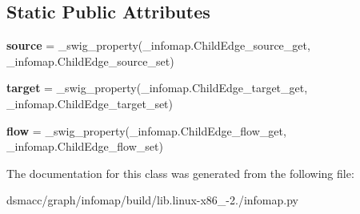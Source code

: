 \subsection*{Static Public Attributes}
\begin{DoxyCompactItemize}
\item 
\mbox{\label{classinfomap_1_1ChildEdge_acae869181b3ff2f642e2d7c5cd6a999a}} 
{\bfseries source} = \+\_\+swig\+\_\+property(\+\_\+infomap.\+Child\+Edge\+\_\+source\+\_\+get, \+\_\+infomap.\+Child\+Edge\+\_\+source\+\_\+set)
\item 
\mbox{\label{classinfomap_1_1ChildEdge_a4333a47eb56d91a50c30a27ad4af1999}} 
{\bfseries target} = \+\_\+swig\+\_\+property(\+\_\+infomap.\+Child\+Edge\+\_\+target\+\_\+get, \+\_\+infomap.\+Child\+Edge\+\_\+target\+\_\+set)
\item 
\mbox{\label{classinfomap_1_1ChildEdge_a7df2a800ca7107691d50564b181814c0}} 
{\bfseries flow} = \+\_\+swig\+\_\+property(\+\_\+infomap.\+Child\+Edge\+\_\+flow\+\_\+get, \+\_\+infomap.\+Child\+Edge\+\_\+flow\+\_\+set)
\end{DoxyCompactItemize}


The documentation for this class was generated from the following file\+:\begin{DoxyCompactItemize}
\item 
dsmacc/graph/infomap/build/lib.\+linux-\/x86\+\_-\/2./infomap.\+py\end{DoxyCompactItemize}

